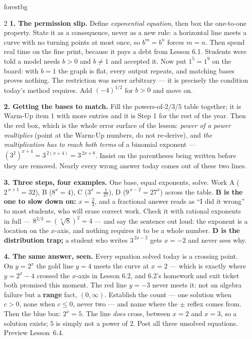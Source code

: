 \documentclass[10pt]{article}
\begin{document}
\begin{skillbox}[Lesson]{forestbg}
\begin{multicols}{2}
\textbf{1. The permission slip.} Define \emph{exponential equation}, then box the one-to-one property.
State it as a consequence, never as a new rule: a horizontal line meets a curve with no turning points
at most once, so $b^{m}=b^{n}$ forces $m=n$. Then spend real time on the fine print, because it pays a
debt from Lesson 6.1. Students were told a model needs $b>0$ and $b\neq1$ and accepted it. Now put
$1^{5}=1^{9}$ on the board: with $b=1$ the graph is flat, every output repeats, and matching bases
proves nothing. The restriction was never arbitrary --- it is precisely the condition today's method
requires. Add $(-4)^{1/2}$ for $b>0$ and move on.

\textbf{2. Getting the bases to match.} Fill the powers-of-$2$/$3$/$5$ table together; it is Warm-Up
item 1 with more entries and it is Step 1 for the rest of the year. Then the red box, which is the
whole error surface of the lesson: \emph{power of a power multiplies} (point at the Warm-Up numbers,
do not re-derive), and \emph{the multiplication has to reach both terms} of a binomial exponent ---
$\left(3^{2}\right)^{x+4}=3^{\,2(x+4)}=3^{\,2x+8}$. Insist on the parentheses being written before
they are removed. Nearly every wrong answer today comes out of these two lines.

\columnbreak

\textbf{3. Three steps, four examples.} One base, equal exponents, solve. Work A ($2^{\,x+1}=32$),
B ($8^{x}=4$), C ($3^{x}=\frac1{27}$), D ($9^{\,x-2}=27^{x}$) across the table. \textbf{B is the one to
slow down on:} $x=\frac23$, and a fractional answer reads as ``I did it wrong'' to most students, who
will erase correct work. Check it with rational exponents in full --- $8^{2/3}=\left(\sqrt[3]8\right)^{2}=4$
--- and say the sentence out loud: the exponent is a location on the $x$-axis, and nothing requires it to
be a whole number. \textbf{D is the distribution trap;} a student who writes $3^{\,2x-2}$ gets $x=-2$
and never sees why.

\textbf{4. The same answer, seen.} Every equation solved today is a crossing point. On $y=2^{x}$ the
gold line $y=4$ meets the curve at $x=2$ --- which is exactly where $y=2^{x}-4$ crossed the $x$-axis in
Lesson 6.2, and 6.2's homework and exit ticket both promised this moment. The red line $y=-3$ never
meets it: not an algebra failure but a \textbf{range} fact, $(0,\infty)$. Establish the count --- one
solution when $c>0$, none when $c\le0$, never two --- and name where the $\pm$ reflex comes from. Then
the blue box: $2^{x}=5$. The line \emph{does} cross, between $x=2$ and $x=3$, so a solution exists;
$5$ is simply not a power of $2$. Post all three unsolved equations. Preview Lesson~6.4.
\end{multicols}
\end{skillbox}
\end{document}
